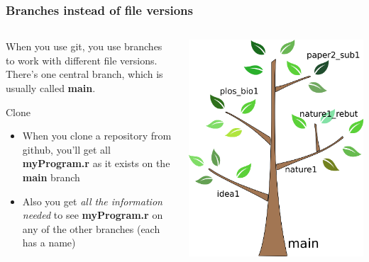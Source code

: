 \documentclass{beamer}
\begin{document}
\begin{frame}
  \frametitle{Branches instead of file versions}
  \begin{columns}[T]
    \begin{column}{.5\textwidth}
      When you use git, you use \alert{branches} to work with
      different file versions. There's one central branch, which
      is usually called \textbf{main}.
      \begin{block}{Clone}
        \begin{itemize}
        \item When you \alert{clone} a repository from github, you'll get all
         \textbf{myProgram.r} as it exists on the \textbf{main} branch

        \item Also you get \emph{all the information needed} to see \textbf{myProgram.r}
          on any of the other branches (each has a name)
        \end{itemize}
      \end{block}
    \end{column}
    \begin{column}{.5\textwidth}
      \includegraphics[width=\textwidth]{tree.png}
    \end{column}
  \end{columns}
\end{frame}
\end{document}
